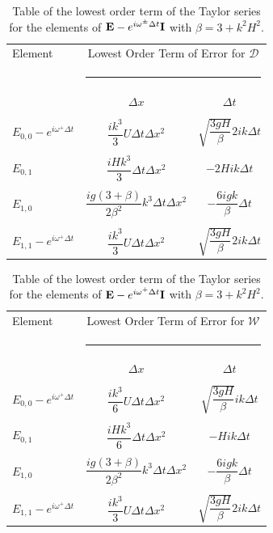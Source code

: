 \begin{table}
	\begin{tabular}{l  c c}
	\hline
		Element & \multicolumn{2}{c}{Lowest Order Term of Error for $\mathcal{D}$}\\
		&  \multicolumn{2}{l}{\rule{0.7\textwidth}{0.4pt}} \\
		& $\Delta x$&$\Delta t$\\
		\hline && \\
		$E_{0,0} -  e^{i \omega^+ \Delta t} $&  $\dfrac{ik^3}{3} U \Delta t \Delta x^2$ & $ \sqrt{\dfrac{3gH}{\beta}} 2ik \Delta t $ \\ & & \\
		$E_{0,1}$& $\dfrac{iHk^3}{3} \Delta t \Delta x^2$ &  $-2Hi k \Delta t$ \\ & & \\
		$E_{1,0}$& $ \dfrac{ig \left(3 + \beta\right)}{2\beta^2} k^3\Delta t \Delta x^2$ &  $ -\dfrac{6igk}{\beta} \Delta t$ \\ & & \\
		$E_{1,1} -  e^{i \omega^+ \Delta t}$& $\dfrac{ik^3}{3} U \Delta t \Delta x^2$ & $ \sqrt{\dfrac{3gH}{\beta}} 2ik \Delta t $ \\  \hline
	\end{tabular}
	\caption{Table of the lowest order term of the Taylor series for the elements of $\mathbf{E} - e^{i \omega^\pm \Delta t} \mathbf{I}$ with $\beta = 3 + k^2 H^2$.}
	\label{tab:EerrD} 
\end{table}

\begin{table}
	\begin{tabular}{l  c c}
	\hline
		Element & \multicolumn{2}{c}{Lowest Order Term of Error for $\mathcal{W}$}\\
		&  \multicolumn{2}{l}{\rule{0.7\textwidth}{0.4pt}} \\
		& $\Delta x$&$\Delta t$\\
		\hline && \\
		$E_{0,0} -  e^{i \omega^+ \Delta t} $&  $\dfrac{ik^3}{6} U \Delta t \Delta x^2$ & $ \sqrt{\dfrac{3gH}{\beta}} ik \Delta t $ \\ & & \\
		$E_{0,1}$& $\dfrac{iHk^3}{6} \Delta t \Delta x^2$ &  $-Hi k \Delta t$ \\ & & \\
		$E_{1,0}$& $ \dfrac{ig \left(3 + \beta\right)}{2\beta^2} k^3\Delta t \Delta x^2$ &  $ -\dfrac{6igk}{\beta} \Delta t$ \\ & & \\
		$E_{1,1} -  e^{i \omega^+ \Delta t}$& $\dfrac{ik^3}{3} U \Delta t \Delta x^2$ & $ \sqrt{\dfrac{3gH}{\beta}} 2ik \Delta t $ \\  \hline
	\end{tabular}
	\caption{Table of the lowest order term of the Taylor series for the elements of $\mathbf{E} - e^{i \omega^+ \Delta t} \mathbf{I}$ with $\beta = 3 + k^2 H^2$.}
	\label{tab:EerrW} 
\end{table}




